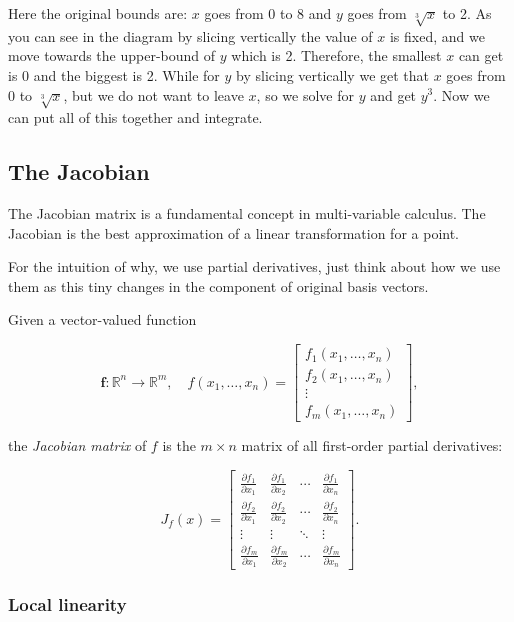 Here the original bounds are: \(x\) goes from 0 to 8 and \(y\) goes from \(\sqrt[3]{x}\) to 2.
As you can see in the diagram by slicing vertically the value of \(x\) is fixed, and we move 
towards the upper-bound of \(y\) which is 2.
Therefore, the smallest \(x\) can get is 0 and the biggest is 2. While for \(y\) by slicing 
vertically we get that \(x\) goes from 0 to \(\sqrt[3]{x}\), but 
we do not want to leave \(x\), so we solve for \(y\) and get \(y^3\). 
Now we can put all of this together and integrate.


\subsection{The Jacobian}

The Jacobian matrix is a fundamental concept in multi-variable calculus. The Jacobian is the best
approximation of a linear transformation for a point.

For the intuition of why, we use partial derivatives, just think about
how we use them as this tiny changes in the component of original
basis vectors.

Given a vector-valued function

\[
\mathbf{f} : \mathbb{R}^n \rightarrow \mathbb{R}^m, \quad f(x_1, \ldots, x_n) = 
\begin{bmatrix}
f_1(x_1, \ldots, x_n) \\
f_2(x_1, \ldots, x_n) \\
\vdots \\
f_m(x_1, \ldots, x_n)
\end{bmatrix},
\]

the \emph{Jacobian matrix} of \(f\) is the \(m \times n\) matrix of all first-order partial derivatives:

\[
J_f(x) = \begin{bmatrix}
\frac{\partial f_1}{\partial x_1} & \frac{\partial f_1}{\partial x_2} & \cdots & \frac{\partial f_1}{\partial x_n} \\
\frac{\partial f_2}{\partial x_1} & \frac{\partial f_2}{\partial x_2} & \cdots & \frac{\partial f_2}{\partial x_n} \\
\vdots & \vdots & \ddots & \vdots \\
\frac{\partial f_m}{\partial x_1} & \frac{\partial f_m}{\partial x_2} & \cdots & \frac{\partial f_m}{\partial x_n}
\end{bmatrix}.
\]

\subsubsection{Local linearity}

